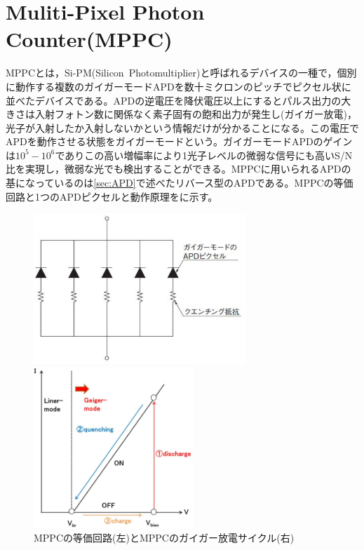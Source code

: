 
\section{Muliti-Pixel Photon Counter(MPPC)\label{sec:MPPC}}
MPPCとは，Si-PM(Silicon\ Photomultiplier)と呼ばれるデバイスの一種で，個別に動作する複数のガイガーモードAPDを数十ミクロンのピッチでピクセル状に並べたデバイスである。APDの逆電圧を降伏電圧以上にするとパルス出力の大きさは入射フォトン数に関係なく素子固有の飽和出力が発生し(ガイガー放電)，光子が入射したか入射しないかという情報だけが分かることになる。この電圧でAPDを動作させる状態をガイガーモードという。ガイガーモードAPDのゲインは$10^5-10^6$でありこの高い増幅率により1光子レベルの微弱な信号にも高いS/N比を実現し，微弱な光でも検出することができる。MPPCに用いられるAPDの基になっているのは\ref{sec:APD}で述べたリバース型のAPDである。MPPCの等価回路と1つのAPDピクセルと動作原理をに示す。
 \begin{figure}[H]
 \hspace{1cm}
 \begin{minipage}{0.4\hsize}
 \begin{center}
 \includegraphics[width=8cm]{image/other/MPPC_touka.eps}
 \end{center}
 \end{minipage}
 \hspace{2cm}
 \begin{minipage}{0.2\hsize}
  \begin{center}
 \includegraphics[width=6cm]{image/other/MPPC_cicle.eps}
 \end{center}
 \end{minipage}
 \caption{MPPCの等価回路(左)\cite{hama_MPPC}とMPPCのガイガー放電サイクル(右)}
 \label{fig:geiger}
\end{figure}

